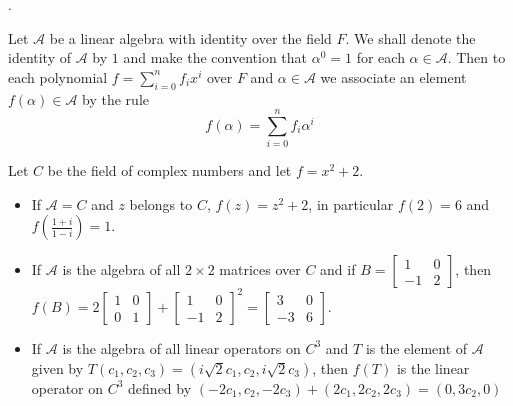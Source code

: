 \documentclass[8pt]{beamer}
\newcommand{\mc}[1]{\mathcal{#1}}
\begin{document}
\begin{frame}{.}
    \begin{definition}
        Let $\mc{A}$ be a linear algebra with identity over the field $F$.
        We shall denote the identity of $\mc{A}$ by $1$ and make the convention that $\alpha^0= 1$ for each $\alpha \in \mc{A}$.
        Then to each polynomial $f = \sum_{i=0}^n f_i x^i$ over $F$ and $\alpha \in \mc{A}$ we associate an element $f(\alpha) \in \mc{A}$ by the rule
        \[
            f(\alpha) = \sum_{i=0}^n f_i \alpha^i
        \]
    \end{definition}

    \begin{example}
        Let $C$ be the field of complex numbers and let $f = x^2 +2$.
        \begin{itemize}
            \item If $\mc{A} = C$ and $z$ belongs to $C$, $f(z) = z^2 +2$, in particular $f(2) = 6$ and $f(\frac{1+i}{1 - i}) = 1$.
            \item If $\mc{A}$ is the algebra of all $2 \times 2$ matrices over $C$ and if $B = \begin{bmatrix}
            1 & 0 \\ -1 & 2
            \end{bmatrix}$,  then $f(B) = 2\begin{bmatrix}
            1 & 0 \\ 0 & 1
            \end{bmatrix} + \begin{bmatrix}
            1 & 0 \\ -1 & 2
            \end{bmatrix}^2 = \begin{bmatrix}
            3 & 0 \\ -3 & 6
            \end{bmatrix}$.
            \item If $\mc{A}$ is the algebra of all linear operators on $C^3$ and $T$ is the element of $\mc{A}$ given by $T(c_1, c_2, c_3) = (i \sqrt{2} c_1, c_2, i \sqrt{2} c_3)$, then $f(T)$ is the linear operator on $C^3$ defined by $(-2 c_1, c_2, -2 c_3) + (2c_1, 2c_2, 2c_3) = (0, 3c_2, 0)$
        \end{itemize}
    \end{example}
\end{frame}
\end{document}
